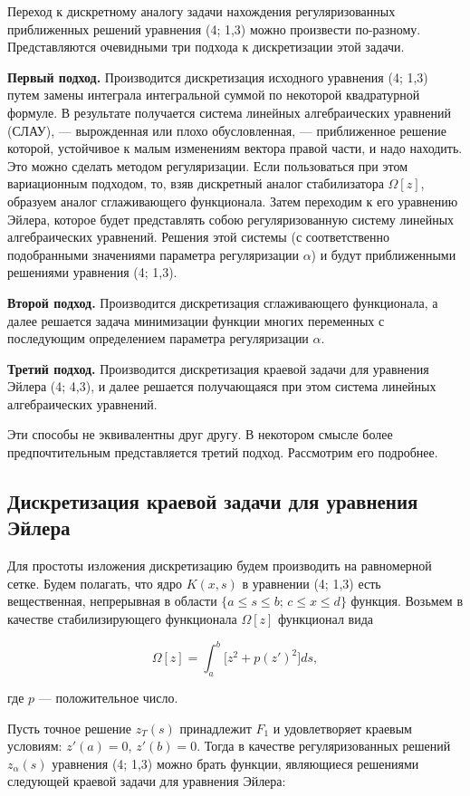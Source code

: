 \documentclass[a4paper,14pt]{extarticle}
\begin{document}
Переход к дискретному аналогу задачи нахождения регуляризованных приближенных решений уравнения (4; 1,3) можно произвести по-разному. Представляются очевидными три подхода к дискретизации этой задачи.

\textbf{Первый подход.} Производится дискретизация исходного уравнения (4; 1,3) путем замены интеграла интегральной суммой по некоторой квадратурной формуле. В результате получается система линейных алгебраических уравнений (СЛАУ), — вырожденная или плохо обусловленная, — приближенное решение которой, устойчивое к малым изменениям вектора правой части, и надо находить. Это можно сделать методом регуляризации. Если пользоваться при этом вариационным подходом, то, взяв дискретный аналог стабилизатора \(\Omega[z]\), образуем аналог сглаживающего функционала. Затем переходим к его уравнению Эйлера, которое будет представлять собою регуляризованную систему линейных алгебраических уравнений. Решения этой системы (с соответственно подобранными значениями параметра регуляризации \(\alpha\)) и будут приближенными решениями уравнения (4; 1,3).

\textbf{Второй подход.} Производится дискретизация сглаживающего функционала, а далее решается задача минимизации функции многих переменных с последующим определением параметра регуляризации \(\alpha\).

\textbf{Третий подход.} Производится дискретизация краевой задачи для уравнения Эйлера (4; 4,3), и далее решается получающаяся при этом система линейных алгебраических уравнений.

Эти способы не эквивалентны друг другу. В некотором смысле более предпочтительным представляется третий подход. Рассмотрим его подробнее.

\subsection{Дискретизация краевой задачи для уравнения Эйлера}

Для простоты изложения дискретизацию будем производить на равномерной сетке. Будем полагать, что ядро \(K(x,s)\) в уравнении (4; 1,3) есть вещественная, непрерывная в области \(\{a \le s \le b; \, c \le x \le d\}\) функция. Возьмем в качестве стабилизирующего функционала \(\Omega[z]\) функционал вида

\[
\Omega[z] = \int_a^b \bigl[ z^2 + p(z')^2 \bigr] ds, \tag{4; 1,4}
\]

где \(p\) — положительное число.

Пусть точное решение \(z_T(s)\) принадлежит \(F_1\) и удовлетворяет краевым условиям: \(z'(a)=0\), \(z'(b)=0\). Тогда в качестве регуляризованных решений \(z_\alpha(s)\) уравнения (4; 1,3) можно брать функции, являющиеся решениями следующей краевой задачи для уравнения Эйлера:
\end{document}
